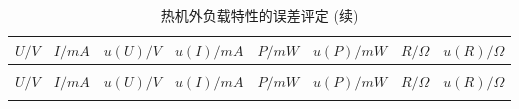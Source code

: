 \documentclass[dvipsnames, svgnames,a4paper,11pt]{article}
\begin{document}
                \begin{longtable}{|c|c|c|c|c|c|c|c|}
                    \caption{热机外负载特性的误差评定}
                    \label{tbl:热机外负载特性的误差评定} \\
                    \hline
                    $U/V$ & $I/mA$ & $u(U)/V$ & $u(I)/mA$ & $P/mW$ & $u(P)/mW$ & $R/\Omega$ & $u(R)/\Omega$ \\
                    \hline
                    \endfirsthead
                    \caption[]{热机外负载特性的误差评定 (续)} \\
                    \hline
                    $U/V$ & $I/mA$ & $u(U)/V$ & $u(I)/mA$ & $P/mW$ & $u(P)/mW$ & $R/\Omega$ & $u(R)/\Omega$ \\
                    \hline
                    \endhead
                    \hline
                    \endfoot
                    

\end{longtable}
\end{document}
